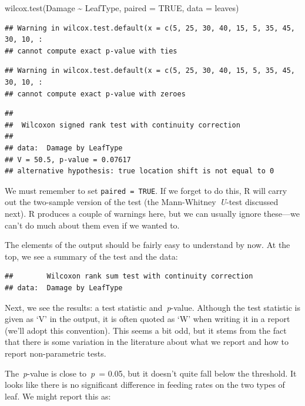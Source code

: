 \documentclass[
]{book}
\newenvironment{Shaded}{\begin{snugshade}}{\end{snugshade}}
\newcommand{\AttributeTok}[1]{\textcolor[rgb]{0.77,0.63,0.00}{#1}}
\newcommand{\ConstantTok}[1]{\textcolor[rgb]{0.00,0.00,0.00}{#1}}
\newcommand{\FunctionTok}[1]{\textcolor[rgb]{0.00,0.00,0.00}{#1}}
\newcommand{\NormalTok}[1]{#1}
\newcommand{\SpecialCharTok}[1]{\textcolor[rgb]{0.00,0.00,0.00}{#1}}
\begin{document}
\begin{Shaded}
\begin{Highlighting}[]
\FunctionTok{wilcox.test}\NormalTok{(Damage }\SpecialCharTok{\textasciitilde{}}\NormalTok{ LeafType, }\AttributeTok{paired =} \ConstantTok{TRUE}\NormalTok{, }\AttributeTok{data =}\NormalTok{ leaves)}
\end{Highlighting}
\end{Shaded}

\begin{verbatim}
## Warning in wilcox.test.default(x = c(5, 25, 30, 40, 15, 5, 35, 45, 30, 10, :
## cannot compute exact p-value with ties
\end{verbatim}

\begin{verbatim}
## Warning in wilcox.test.default(x = c(5, 25, 30, 40, 15, 5, 35, 45, 30, 10, :
## cannot compute exact p-value with zeroes
\end{verbatim}

\begin{verbatim}
## 
##  Wilcoxon signed rank test with continuity correction
## 
## data:  Damage by LeafType
## V = 50.5, p-value = 0.07617
## alternative hypothesis: true location shift is not equal to 0
\end{verbatim}

We must remember to set \texttt{paired\ =\ TRUE}. If we forget to do this, R will carry out the two-sample version of the test (the Mann-Whitney~\emph{U}-test discussed next). R produces a couple of warnings here, but we can usually ignore these---we can't do much about them even if we wanted to.

The elements of the output should be fairly easy to understand by now. At the top, we see a summary of the test and the data:

\begin{verbatim}
##        Wilcoxon rank sum test with continuity correction
## data:  Damage by LeafType
\end{verbatim}

Next, we see the results: a test statistic and~\emph{p}-value. Although the test statistic is given as `V' in the output, it is often quoted as `W' when writing it in a report (we'll adopt this convention). This seems a bit odd, but it stems from the fact that there is some variation in the literature about what we report and how to report non-parametric tests.

The~\emph{p}-value is close to~\emph{p}~= 0.05, but it doesn't quite fall below the threshold. It looks like there is no significant difference in feeding rates on the two types of leaf. We might report this as:
\end{document}
